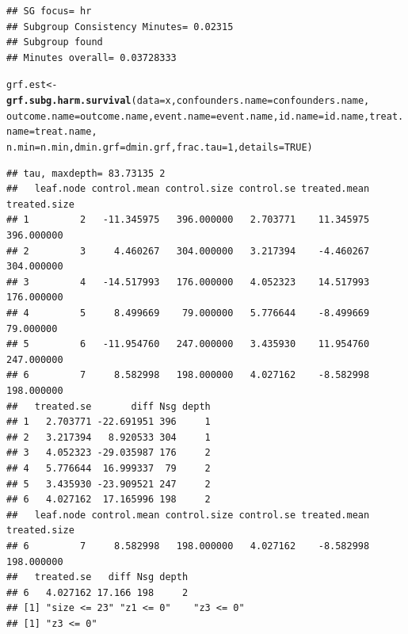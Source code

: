 \documentclass[smallextended]{svjour3}
\makeatletter
\newcommand{\hlnum}[1]{\textcolor[rgb]{0.686,0.059,0.569}{#1}}%
\newcommand{\hlstd}[1]{\textcolor[rgb]{0.345,0.345,0.345}{#1}}%
\newcommand{\hlkwb}[1]{\textcolor[rgb]{0.69,0.353,0.396}{#1}}%
\newcommand{\hlkwc}[1]{\textcolor[rgb]{0.333,0.667,0.333}{#1}}%
\newcommand{\hlkwd}[1]{\textcolor[rgb]{0.737,0.353,0.396}{\textbf{#1}}}%
\newenvironment{kframe}{%
 \def\at@end@of@kframe{}%
 \ifinner\ifhmode%
  \def\at@end@of@kframe{\end{minipage}}%
  \begin{minipage}{\columnwidth}%
 \fi\fi%
 \def\FrameCommand##1{\hskip\@totalleftmargin \hskip-\fboxsep
 \colorbox{shadecolor}{##1}\hskip-\fboxsep
     \hskip-\linewidth \hskip-\@totalleftmargin \hskip\columnwidth}%
 \MakeFramed {\advance\hsize-\width
   \@totalleftmargin\z@ \linewidth\hsize
   \@setminipage}}%
 {\par\unskip\endMakeFramed%
 \at@end@of@kframe}
\newenvironment{knitrout}{}{} %
\makeatother
\begin{document}
\begin{knitrout}
\begin{kframe}
\begin{verbatim}
## SG focus= hr 
## Subgroup Consistency Minutes= 0.02315 
## Subgroup found 
## Minutes overall= 0.03728333
\end{verbatim}
\begin{alltt}
\hlstd{grf.est} \hlkwb{<-} \hlkwd{grf.subg.harm.survival}\hlstd{(}\hlkwc{data} \hlstd{= x,} \hlkwc{confounders.name} \hlstd{= confounders.name,}
    \hlkwc{outcome.name} \hlstd{= outcome.name,} \hlkwc{event.name} \hlstd{= event.name,} \hlkwc{id.name} \hlstd{= id.name,} \hlkwc{treat.name} \hlstd{= treat.name,}
    \hlkwc{n.min} \hlstd{= n.min,} \hlkwc{dmin.grf} \hlstd{= dmin.grf,} \hlkwc{frac.tau} \hlstd{=} \hlnum{1}\hlstd{,} \hlkwc{details} \hlstd{=} \hlnum{TRUE}\hlstd{)}
\end{alltt}
\begin{verbatim}
## tau, maxdepth= 83.73135 2 
##   leaf.node control.mean control.size control.se treated.mean treated.size
## 1         2   -11.345975   396.000000   2.703771    11.345975   396.000000
## 2         3     4.460267   304.000000   3.217394    -4.460267   304.000000
## 3         4   -14.517993   176.000000   4.052323    14.517993   176.000000
## 4         5     8.499669    79.000000   5.776644    -8.499669    79.000000
## 5         6   -11.954760   247.000000   3.435930    11.954760   247.000000
## 6         7     8.582998   198.000000   4.027162    -8.582998   198.000000
##   treated.se       diff Nsg depth
## 1   2.703771 -22.691951 396     1
## 2   3.217394   8.920533 304     1
## 3   4.052323 -29.035987 176     2
## 4   5.776644  16.999337  79     2
## 5   3.435930 -23.909521 247     2
## 6   4.027162  17.165996 198     2
##   leaf.node control.mean control.size control.se treated.mean treated.size
## 6         7     8.582998   198.000000   4.027162    -8.582998   198.000000
##   treated.se   diff Nsg depth
## 6   4.027162 17.166 198     2
## [1] "size <= 23" "z1 <= 0"    "z3 <= 0"   
## [1] "z3 <= 0"
\end{verbatim}
\end{kframe}
\end{knitrout}
\end{document}

